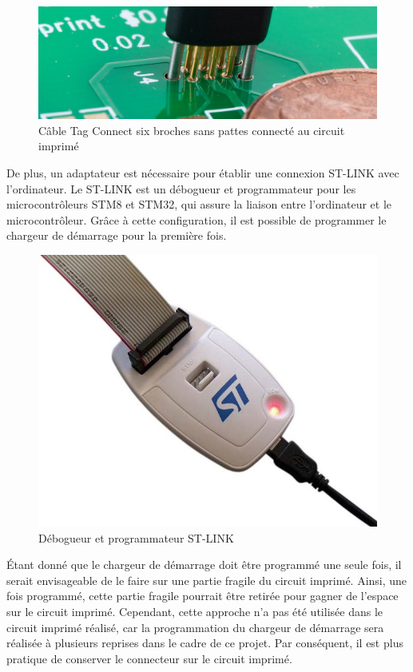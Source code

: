 \begin{figure}[H]
    \centering
    \includegraphics[scale=0.2]{./assets/figures/tag_connect_pcb.jpg}
    \caption{\cite{tag_connect_pcb} Câble Tag Connect six broches sans pattes connecté au circuit imprimé}
\end{figure}

De plus, un adaptateur est nécessaire pour établir une connexion ST-LINK avec l'ordinateur.
Le ST-LINK est un débogueur et programmateur pour les microcontrôleurs STM8 et STM32, qui assure la liaison entre l'ordinateur et le microcontrôleur.
Grâce à cette configuration, il est possible de programmer le chargeur de démarrage pour la première fois.

\begin{figure}[H]
    \centering
    \includegraphics[scale=0.3]{./assets/figures/st_link.jpg}
    \caption{\cite{st_link} Débogueur et programmateur ST-LINK}
\end{figure}

Étant donné que le chargeur de démarrage doit être programmé une seule fois, il serait envisageable de le faire sur une partie fragile du circuit imprimé.
Ainsi, une fois programmé, cette partie fragile pourrait être retirée pour gagner de l'espace sur le circuit imprimé.
Cependant, cette approche n'a pas été utilisée dans le circuit imprimé réalisé, car la programmation du chargeur de démarrage sera réalisée à plusieurs reprises dans le cadre de ce projet.
Par conséquent, il est plus pratique de conserver le connecteur sur le circuit imprimé.

